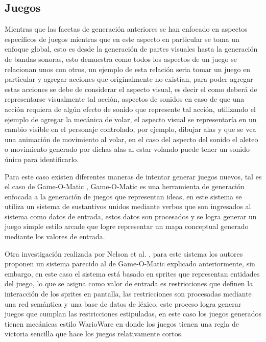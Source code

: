 \subsection{Juegos}
\label{subsection:games}

Mientras que las facetas de generación anteriores se han enfocado en aspectos
específicos de juegos mientras que en este aspecto en particular se toma un
enfoque global, esto es desde la generación de partes visuales hasta la 
generación de bandas sonoras, esto demuestra como todos los aspectos de un
juego se relacionan unos con otros, un ejemplo de esta relación seria tomar un
juego en particular y agregar acciones que originalmente no existían, para poder
agregar estas acciones se debe de considerar el aspecto visual, es decir el como
deberá de representarse visualmente tal acción, aspectos de sonidos en caso de
que una acción requiera de algún efecto de sonido que represente tal acción,
utilizando el ejemplo de agregar la mecánica de volar, el aspecto visual se
representaría en un cambio visible en el personaje controlado, por ejemplo,
dibujar alas y que se vea una animación de movimiento al volar, en el caso del
aspecto del sonido el aleteo o movimiento generado por dichas alas al estar
volando puede tener un sonido único para identificarlo.

Para este caso existen diferentes maneras de intentar generar juegos nuevos, tal
es el caso de Game-O-Matic \cite{treanor2012game}, Game-O-Matic es una
herramienta de generación enfocada a la generación de juegos que representan
ideas, en este sistema se utiliza un sistema de sustantivos unidos mediante
verbos que son ingresados al sistema como datos de entrada, estos datos son
procesados y se logra generar un juego simple estilo arcade que logre
representar un mapa conceptual generado mediante los valores de entrada. 

Otra investigación realizada por Nelson et al. \cite{Nelson2008}, para este
sistema los autores proponen un sistema parecido al de Game-O-Matic explicado
anteriormente, sin embargo, en este caso el sistema está basado en sprites que
representan entidades del juego, lo que se asigna como valor de entrada es
restricciones que definen la interacción de los sprites en pantalla, las
restricciones son procesadas mediante una red semántica y una base de datos de
léxico, este proceso logra generar juegos que cumplan las restricciones
estipuladas, en este caso los juegos generados tienen mecánicas estilo WarioWare
en donde los juegos tienen una regla de victoria sencilla que hace los juegos
relativamente cortos. 

